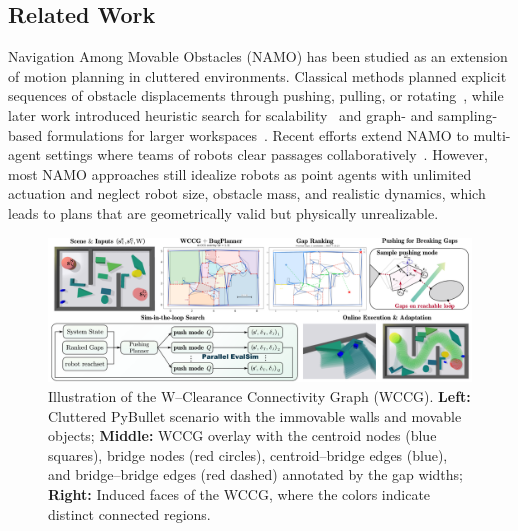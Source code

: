 \subsection{Related Work}\label{subsec:intro-related}

Navigation Among Movable Obstacles (NAMO) has been studied as an extension of
motion planning in cluttered environments. Classical methods planned explicit
sequences of obstacle displacements through pushing, pulling, or
rotating~\cite{stilman2005navigation,stilman2007manipulation}, while later work
introduced heuristic search for scalability~\cite{stilman2007manipulation} and
graph- and sampling-based formulations for larger workspaces~\cite{yao2024local}.
Recent efforts extend NAMO to multi-agent settings where teams of robots clear
passages collaboratively~\cite{tang2024collaborative,ren2025search}. However,
most NAMO approaches still idealize robots as point agents with unlimited
actuation and neglect robot size, obstacle mass, and realistic dynamics, which
leads to plans that are geometrically valid but physically unrealizable.


\begin{figure}[t!]
  \centering
  \includegraphics[width=\linewidth]{figures/overall.png}
  \vspace{-0.2in}
  \caption{Illustration of the W--Clearance Connectivity Graph (WCCG).
\textbf{Left:} Cluttered PyBullet scenario with the immovable walls and movable objects;
\textbf{Middle:} WCCG overlay with the centroid nodes (blue squares), bridge nodes
(red circles), centroid--bridge edges (blue), and bridge--bridge edges (red dashed)
annotated by the gap widths;
\textbf{Right:} Induced faces of the WCCG, where the colors indicate distinct connected
regions.}
  \label{fig:wccg}
  \vspace{-0.2in}
\end{figure}


